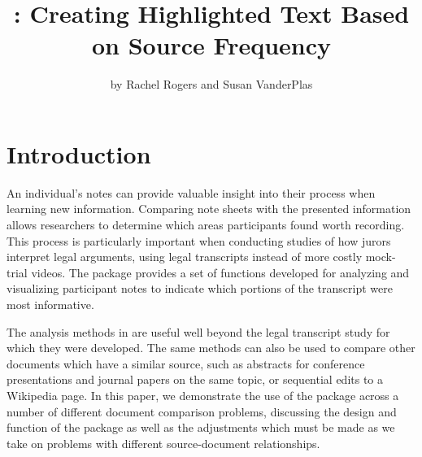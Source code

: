 \title{: Creating Highlighted Text Based on Source Frequency}


\author{by Rachel Rogers and Susan VanderPlas}

\maketitle


\section{Introduction}\label{introduction}

An individual's notes can provide valuable insight into their process when learning new information.
Comparing note sheets with the presented information allows researchers to determine which areas participants found worth recording.
This process is particularly important when conducting studies of how jurors interpret legal arguments, using legal transcripts instead of more costly mock-trial videos.
The  package \citep{highlightr} provides a set of functions developed for analyzing and visualizing participant notes to indicate which portions of the transcript were most informative.

The analysis methods in  are useful well beyond the legal transcript study for which they were developed.
The same methods can also be used to compare other documents which have a similar source, such as abstracts for conference presentations and journal papers on the same topic, or sequential edits to a Wikipedia page.
In this paper, we demonstrate the use of the  package across a number of different document comparison problems, discussing the design and function of the package as well as the adjustments which must be made as we take on problems with different source-document relationships.

